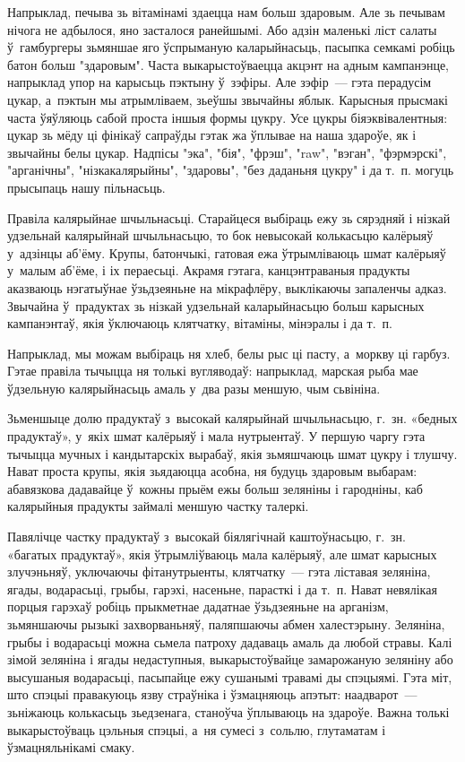 Напрыклад, печыва зь вітамінамі здаецца нам больш здаровым. Але зь печывам нічога не адбылося, яно засталося ранейшымі. Або адзін маленькі ліст салаты ў~гамбургеры зьмяншае яго ўспрыманую каларыйнасьць, пасыпка семкамі робіць батон больш "здаровым". Часта выкарыстоўваецца акцэнт на адным кампанэнце, напрыклад упор на карысьць пэктыну ў~зэфіры. Але зэфір~--- гэта перадусім цукар, а~пэктын мы атрымліваем, зьеўшы звычайны яблык. Карысныя прысмакі часта ўяўляюць сабой проста іншыя формы цукру. Усе цукры біяэквівалентныя: цукар зь мёду ці фінікаў сапраўды гэтак жа ўплывае на наша здароўе, як і звычайны белы цукар. Надпісы "эка", "бія", "фрэш", "raw", "вэган", "фэрмэрскі", "арганічны", "нізкакалярыйны", "здаровы", "без даданьня цукру" і да т.~п. могуць прысыпаць нашу пільнасьць.

Правіла калярыйнае шчыльнасьці. Старайцеся выбіраць ежу зь сярэдняй і нізкай удзельнай калярыйнай шчыльнасьцю, то бок невысокай колькасьцю калёрыяў у~адзінцы аб'ёму. Крупы, батончыкі, гатовая ежа ўтрымліваюць шмат калёрыяў у~малым аб'ёме, і іх пераесьці. Акрамя гэтага, канцэнтраваныя прадукты аказваюць нэгатыўнае ўзьдзеяньне на мікрафлёру, выклікаючы запаленчы адказ. Звычайна ў~прадуктах зь нізкай удзельнай каларыйнасьцю больш карысных кампанэнтаў, якія ўключаюць клятчатку, вітаміны, мінэралы і да т.~п.

Напрыклад, мы можам выбіраць ня хлеб, белы рыс ці пасту, а~моркву ці гарбуз. Гэтае правіла тычыцца ня толькі вугляводаў: напрыклад, марская рыба мае ўдзельную калярыйнасьць амаль у~два разы меншую, чым сьвініна.

Зьменшыце долю прадуктаў з~высокай калярыйнай шчыльнасьцю, г.~зн. «бедных прадуктаў», у~якіх шмат калёрыяў і мала нутрыентаў. У першую чаргу гэта тычыцца мучных і кандытарскіх вырабаў, якія зьмяшчаюць шмат цукру і тлушчу. Нават проста крупы, якія зьядаюцца асобна, ня будуць здаровым выбарам: абавязкова дадавайце ў~кожны прыём ежы больш зеляніны і гародніны, каб калярыйныя прадукты займалі меншую частку талеркі.

Павялічце частку прадуктаў з~высокай біялягічнай каштоўнасьцю, г.~зн. «багатых прадуктаў», якія ўтрымліўваюць мала калёрыяў, але шмат карысных злучэньняў, уключаючы фітанутрыенты, клятчатку~--- гэта ліставая зеляніна, ягады, водарасьці, грыбы, гарэхі, насеньне, парасткі і да т.~п. Нават невялікая порцыя гарэхаў робіць прыкметнае дадатнае ўзьдзеяньне на арганізм, зьмяншаючы рызыкі захворваньняў, паляпшаючы абмен халестэрыну. Зеляніна, грыбы і водарасьці можна сьмела патроху дадаваць амаль да любой стравы. Калі зімой зеляніна і ягады недаступныя, выкарыстоўвайце замарожаную зеляніну або высушаныя водарасьці, пасыпайце ежу сушанымі травамі ды спэцыямі. Гэта міт, што спэцыі правакуюць язву страўніка і ўзмацняюць апэтыт: наадварот~--- зьніжаюць колькасьць зьедзенага, станоўча ўплываюць на здароўе. Важна толькі выкарыстоўваць цэльныя спэцыі, а~ня сумесі з~сольлю, глутаматам і ўзмацняльнікамі смаку.


